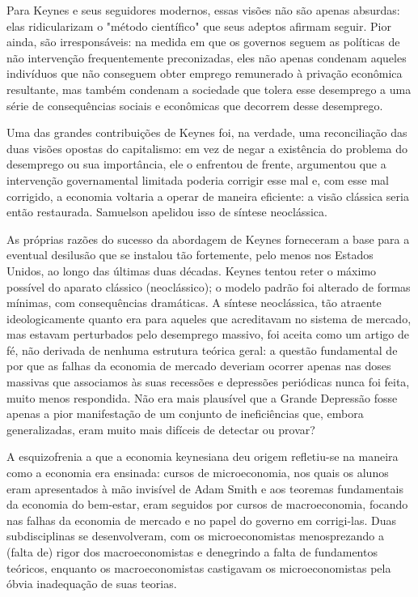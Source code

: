 \documentclass[12pt]{article}
\begin{document}
Para Keynes e seus seguidores modernos, essas visões não são apenas absurdas: elas ridicularizam o "método científico" que seus adeptos afirmam seguir. Pior ainda, são irresponsáveis: na medida em que os governos seguem as políticas de não intervenção frequentemente preconizadas, eles não apenas condenam aqueles indivíduos que não conseguem obter emprego remunerado à privação econômica resultante, mas também condenam a sociedade que tolera esse desemprego a uma série de consequências sociais e econômicas que decorrem desse desemprego.

Uma das grandes contribuições de Keynes foi, na verdade, uma reconciliação das duas visões opostas do capitalismo: em vez de negar a existência do problema do desemprego ou sua importância, ele o enfrentou de frente, argumentou que a intervenção governamental limitada poderia corrigir esse mal e, com esse mal corrigido, a economia voltaria a operar de maneira eficiente: a visão clássica seria então restaurada. Samuelson apelidou isso de síntese neoclássica.

As próprias razões do sucesso da abordagem de Keynes forneceram a base para a eventual desilusão que se instalou tão fortemente, pelo menos nos Estados Unidos, ao longo das últimas duas décadas. Keynes tentou reter o máximo possível do aparato clássico (neoclássico); o modelo padrão foi alterado de formas mínimas, com consequências dramáticas. A síntese neoclássica, tão atraente ideologicamente quanto era para aqueles que acreditavam no sistema de mercado, mas estavam perturbados pelo desemprego massivo, foi aceita como um artigo de fé, não derivada de nenhuma estrutura teórica geral: a questão fundamental de por que as falhas da economia de mercado deveriam ocorrer apenas nas doses massivas que associamos às suas recessões e depressões periódicas nunca foi feita, muito menos respondida. Não era mais plausível que a Grande Depressão fosse apenas a pior manifestação de um conjunto de ineficiências que, embora generalizadas, eram muito mais difíceis de detectar ou provar?

A esquizofrenia a que a economia keynesiana deu origem refletiu-se na maneira como a economia era ensinada: cursos de microeconomia, nos quais os alunos eram apresentados à mão invisível de Adam Smith e aos teoremas fundamentais da economia do bem-estar, eram seguidos por cursos de macroeconomia, focando nas falhas da economia de mercado e no papel do governo em corrigi-las. Duas subdisciplinas se desenvolveram, com os microeconomistas menosprezando a (falta de) rigor dos macroeconomistas e denegrindo a falta de fundamentos teóricos, enquanto os macroeconomistas castigavam os microeconomistas pela óbvia inadequação de suas teorias.
\end{document}
